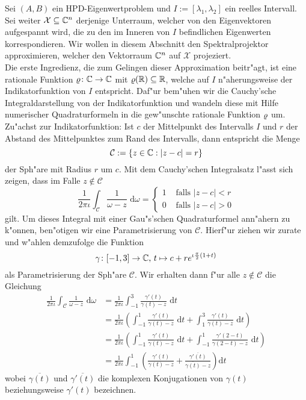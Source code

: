 Sei $(A,B)$ ein HPD-Eigenwertproblem und $I:=[\lambda_1, \lambda_2]$ ein reelles Intervall. Sei weiter $\mathcal{X}\subseteq\mathbb{C}^n$ derjenige Unterraum, welcher von den Eigenvektoren aufgespannt wird, die zu den im Inneren von $I$ befindlichen Eigenwerten korrespondieren. Wir wollen in diesem Abschnitt den Spektralprojektor approximieren, welcher den Vektorraum $\mathbb{C}^n$ auf $\mathcal{X}$ projeziert.\\

Die erste Ingredienz, die zum Gelingen dieser Approximation beitr"agt, ist eine rationale Funktion $\varrho\colon\mathbb{C}\to\mathbb{C}$ mit $\varrho(\mathbb{R}) \subseteq \mathbb{R}$, welche auf $I$ n"aherungsweise der Indikatorfunktion von $I$ entspricht.
Daf"ur bem"uhen wir die Cauchy'sche Integraldarstellung von der Indikatorfunktion und
wandeln diese mit Hilfe numerischer Quadraturformeln in die gew"unschte
rationale Funktion $\varrho$ um.\\

Zu"achst zur Indikatorfunktion: Ist $c$ der Mittelpunkt des Intervalls $I$ und
$r$ der Abstand des Mittelpunktes zum Rand des Intervalls, dann entspricht die Menge
\[
\mathcal{C} := \{z\in\mathbb{C} : |z-c| = r\}
\]
der Sph"are mit Radius $r$ um $c$. Mit dem Cauchy'schen Integralsatz
l"asst sich zeigen, dass im Falle $z\notin \mathcal{C}$
\[
\frac{1}{2\pi\iota}\int_{ \mathcal{C}}\frac{1}{\omega-z}\text{ d}\omega
= \begin{cases}1 &\text{ falls }|z-c| < r \\ 0 &\text{ falls }|z-c| > 0 \end{cases}
\]
gilt. Um dieses Integral mit einer Gau"s'schen Quadraturformel ann"ahern zu k"onnen, ben"otigen wir eine Parametrisierung von $\mathcal{C}$. Hierf"ur ziehen wir \cite{ptep} zurate und w"ahlen demzufolge
die Funktion
\[
\gamma\colon[-1,3]\to\mathbb{C}\text{, }
t\mapsto c+re^{\iota \frac{\pi}{2}(1+t)}
\]
als Parametrisierung der Sph"are $\mathcal{C}$.
Wir erhalten dann f"ur alle $z\notin\mathcal{C}$ die Gleichung
\begin{align*}
\frac{1}{2\pi\iota}\int_{ \mathcal{C}}\frac{1}{\omega-z}\text{ d}\omega
&= \frac{1}{2\pi\iota} \int_{-1}^3 \frac{\gamma'(t)}{\gamma(t)-z}\text{ d}t \\
&= \frac{1}{2\pi\iota} \left( \int_{-1}^1 \frac{\gamma'(t)}{\gamma(t)-z} \text{ d}t +
\int_{1}^3\frac{\gamma'(t)}{\gamma(t)-z}\text{ d}t \right) \\
&= \frac{1}{2\pi\iota} \left( \int_{-1}^1 \frac{\gamma'(t)}{\gamma(t)-z} \text{ d}t +
\int_{-1}^1\frac{\gamma'(2-t)}{\gamma(2-t)-z}\text{ d}t \right) \\
&= \frac{1}{2\pi\iota} \int_{-1}^1 \left( \frac{\gamma'(t)}{\gamma(t)-z} +
\frac{\overline{\gamma'(t)}}{\overline{\gamma(t)}-z}\right)\text{d}t
\end{align*}
wobei $\overline{\gamma(t)}$ und $\overline{\gamma'(t)}$ die komplexen Konjugationen
von $\gamma(t)$ beziehungsweise $\gamma'(t)$ bezeichnen.

